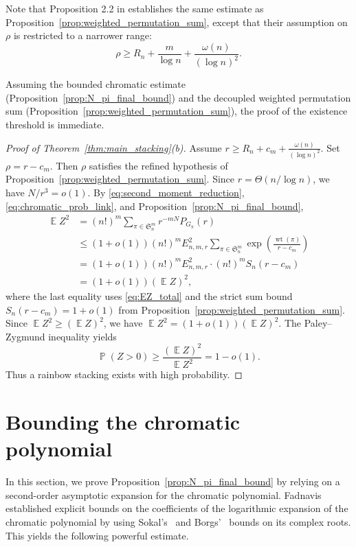 \documentclass[10pt,a4paper]{amsart}
\newcommand\E{\operatorname{\mathbb{E}}}
\renewcommand\Pr{\operatorname{\mathbb{P}}}
\renewcommand\leq{\leqslant}
\renewcommand\geq{\geqslant}
\renewcommand\ge{\geqslant}
\newcommand{\wt}{\operatorname{wt}}
\begin{document}
Note that Proposition 2.2 in \cite{ADK} establishes the same estimate as Proposition~\ref{prop:weighted_permutation_sum}, except that their assumption on $\rho$ is restricted to a narrower range:
\[
\rho\ge R_n+\frac{m}{\log n}+\frac{\omega(n)}{(\log n)^2}.
\]



Assuming the bounded chromatic estimate (Proposition~\ref{prop:N_pi_final_bound}) and the decoupled weighted permutation sum (Proposition~\ref{prop:weighted_permutation_sum}), the proof of the existence threshold is immediate.

\begin{proof}[Proof of Theorem~\ref{thm:main_stacking}\textup{(b)}]
Assume $r\geq R_n+c_m+\frac{\omega(n)}{(\log n)^2}$. Set $\rho=r-c_m$. Then $\rho$ satisfies the refined hypothesis of Proposition~\ref{prop:weighted_permutation_sum}. Since $r=\Theta(n/\log n)$, we have $N/r^3=o(1)$. By \eqref{eq:second_moment_reduction}, \eqref{eq:chromatic_prob_link}, and Proposition~\ref{prop:N_pi_final_bound},
\begin{align*}
        \E Z^2
        &=(n!)^m\sum_{\pi\in\mathfrak S_n^m}r^{-mN}P_{G_\pi}(r)\\
        &\leq (1+o(1))(n!)^mE_{n,m,r}^2
        \sum_{\pi\in\mathfrak S_n^m}
        \exp\left(\frac{\wt(\pi)}{r-c_m}\right)\\
        &=(1+o(1))(n!)^mE_{n,m,r}^2\cdot (n!)^m S_n(r-c_m)\\
        &=(1+o(1))(\E Z)^2,
\end{align*}
where the last equality uses \eqref{eq:EZ_total} and the strict sum bound $S_n(r-c_m) = 1+o(1)$ from Proposition~\ref{prop:weighted_permutation_sum}.  Since $\E Z^2\geq(\E Z)^2$, we have $\E Z^2=(1+o(1))(\E Z)^2$. The Paley--Zygmund inequality yields 
$$\Pr(Z>0)\geq \frac{(\E Z)^2}{\E Z^2}=1-o(1).$$ 
Thus a rainbow stacking exists with high probability.
\end{proof}

\medskip

\section{Bounding the chromatic polynomial}\label{sec:bound_chromatic}

In this section, we prove Proposition~\ref{prop:N_pi_final_bound} by relying on a second-order asymptotic expansion for the chromatic polynomial. Fadnavis \cite{Fadnavis} established explicit bounds on the coefficients of the logarithmic expansion of the chromatic polynomial by using Sokal's~\cite{Sokal} and Borgs'~\cite{Borgs} bounds on its complex roots. This yields the following powerful estimate.
\end{document}
